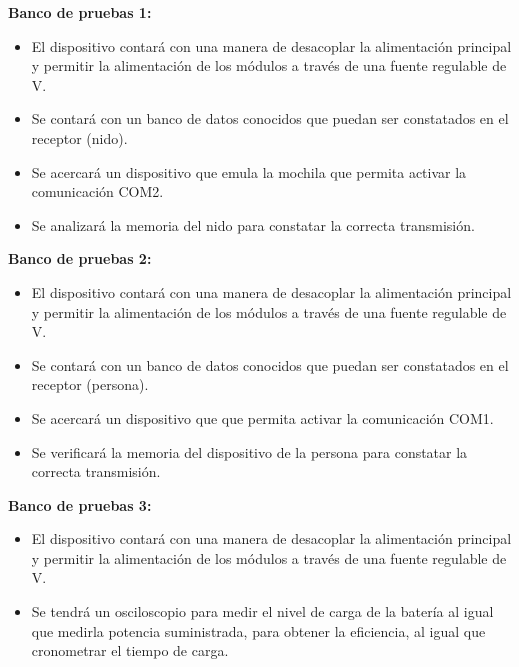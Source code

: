 
\textbf{Banco de pruebas 1:}
\begin{itemize}
	\item El dispositivo contará con una manera de desacoplar la alimentación principal y permitir la alimentación de los módulos a través de una fuente regulable de \TBD V.%
	\item Se contará con un banco de datos conocidos que puedan ser constatados en el receptor (nido).	
	\item Se acercará un dispositivo que emula la mochila que permita activar la comunicación COM2.
	\item Se analizará la memoria del nido para constatar la correcta transmisión.
\end{itemize}

\textbf{Banco de pruebas 2:}
\begin{itemize}
	\item El dispositivo contará con una manera de desacoplar la alimentación principal y permitir la alimentación de los módulos a través de una fuente regulable de \TBD V.%
	\item Se contará con un banco de datos conocidos que puedan ser constatados en el receptor (persona).	
	\item Se acercará un dispositivo que que permita activar la comunicación COM1.
	\item Se verificará la memoria del dispositivo de la persona para constatar la correcta transmisión.
\end{itemize}

\textbf{Banco de pruebas 3:}
\begin{itemize}
	\item El dispositivo contará con una manera de desacoplar la alimentación principal y permitir la alimentación de los módulos a través de una fuente regulable de \TBD V.%
	\item Se tendrá un osciloscopio para medir el nivel de carga de la batería al igual que medirla potencia suministrada, para obtener la eficiencia, al igual que cronometrar el tiempo de carga.
\end{itemize}


